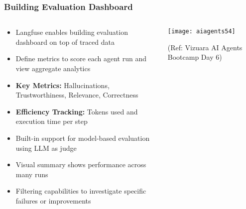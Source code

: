 \begin{frame}[fragile]\frametitle{Building Evaluation Dashboard}
\begin{columns}
    \begin{column}[T]{0.6\linewidth}
      \begin{itemize}
		\item Langfuse enables building evaluation dashboard on top of traced data
		\item Define metrics to score each agent run and view aggregate analytics
		\item \textbf{Key Metrics:} Hallucinations, Trustworthiness, Relevance, Correctness
		\item \textbf{Efficiency Tracking:} Tokens used and execution time per step
		\item Built-in support for model-based evaluation using LLM as judge
		\item Visual summary shows performance across many runs
		\item Filtering capabilities to investigate specific failures or improvements
	  \end{itemize}
    \end{column}
    \begin{column}[T]{0.4\linewidth}
		\begin{center}
		\texttt{[image: aiagents54]}
		
		{\tiny (Ref: Vizuara AI Agents Bootcamp Day 6)}
		\end{center}	
    \end{column}
  \end{columns}
\end{frame}


